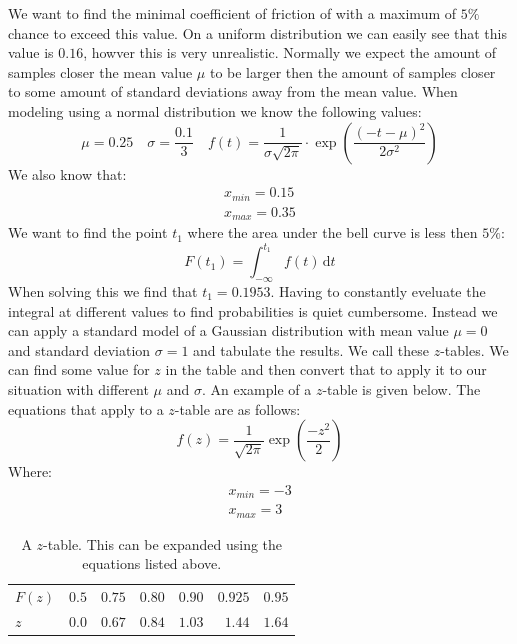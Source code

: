 \documentclass[11pt, a4paper]{article}
\renewcommand*{\d}{\text{d}}
\numberwithin{equation}{section}
\numberwithin{figure}{section}
\begin{document}
We want to find the minimal coefficient of friction of with a maximum of $5\%$ chance to exceed this value. On a uniform distribution we can easily see that this value is $0.16$, howver this is very unrealistic. Normally we expect the amount of samples closer the mean value $\mu$ to be larger then the amount of samples closer to some amount of standard deviations away from the mean value. When modeling using a normal distribution we know the following values:
\begin{equation*}
  \mu = 0.25 \quad \sigma = \frac{0.1}{3} \quad f(t) = \frac{1}{\sigma\sqrt{2\pi}} \cdot \exp\left( \frac{(-t-\mu)^2}{2\sigma^2} \right)
\end{equation*}
We also know that:
\begin{gather*}
  x_{min} = 0.15\\
  x_{max} = 0.35
\end{gather*}
We want to find the point $t_1$ where the area under the bell curve is less then $5\%$:
\begin{equation*}
  F(t_1) = \int_{-\infty}^{t_1} f(t)\,\d t
\end{equation*}
When solving this we find that $t_1 = 0.1953$. Having to constantly eveluate the integral at different values to find probabilities is quiet cumbersome. Instead we can apply a standard model of a Gaussian distribution with mean value $\mu = 0$ and standard deviation $\sigma=1$ and tabulate the results. We call these $z$-tables. We can find some value for $z$ in the table and then convert that to apply it to our situation with different $\mu$ and $\sigma$. An example of a $z$-table is given below. The equations that apply to a $z$-table are as follows:
\begin{equation*}
  f(z) = \frac{1}{\sqrt{2\pi}}\exp\left( \frac{-z^2}{2} \right)
\end{equation*}
Where:
\begin{gather*}
  x_{min} = -3\\
  x_{max} = 3
\end{gather*}
\begin{table}[h]
  \caption{A $z$-table. This can be expanded using the equations listed above.} %
  \centering %
  \begin{tabular}{l rrrrrr} %
  \hline
   $F(z)$ & $0.5$ & $0.75$ & $0.80$ & $0.90$ & $0.925$ & $0.95$ \\ 
    $z$   & $0.0$ & $0.67$ & $0.84$ & $1.03$ & $1.44$  & $1.64$ \\
  \hline %
  \end{tabular}
\end{table}
\end{document}
